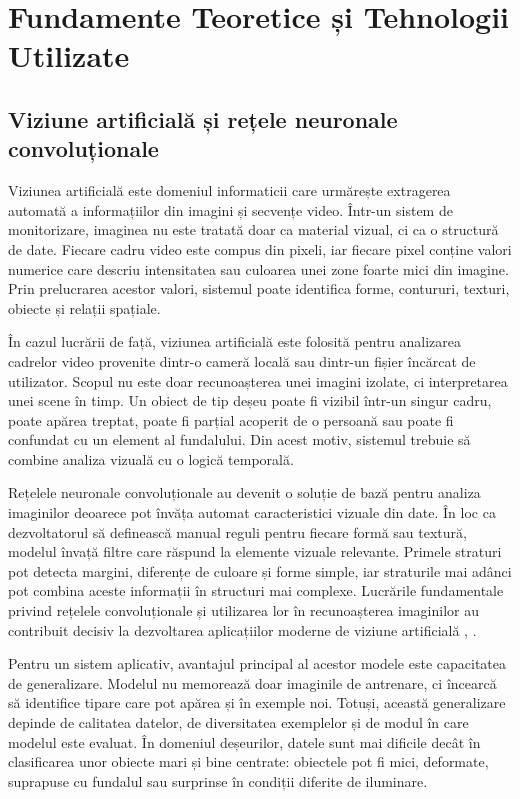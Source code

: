 \chapter{Fundamente Teoretice și Tehnologii Utilizate}

\section{Viziune artificială și rețele neuronale convoluționale}

Viziunea artificială este domeniul informaticii care urmărește extragerea automată a informațiilor din imagini și secvențe video. Într-un sistem de monitorizare, imaginea nu este tratată doar ca material vizual, ci ca o structură de date. Fiecare cadru video este compus din pixeli, iar fiecare pixel conține valori numerice care descriu intensitatea sau culoarea unei zone foarte mici din imagine. Prin prelucrarea acestor valori, sistemul poate identifica forme, contururi, texturi, obiecte și relații spațiale.

În cazul lucrării de față, viziunea artificială este folosită pentru analizarea cadrelor video provenite dintr-o cameră locală sau dintr-un fișier încărcat de utilizator. Scopul nu este doar recunoașterea unei imagini izolate, ci interpretarea unei scene în timp. Un obiect de tip deșeu poate fi vizibil într-un singur cadru, poate apărea treptat, poate fi parțial acoperit de o persoană sau poate fi confundat cu un element al fundalului. Din acest motiv, sistemul trebuie să combine analiza vizuală cu o logică temporală.

Rețelele neuronale convoluționale au devenit o soluție de bază pentru analiza imaginilor deoarece pot învăța automat caracteristici vizuale din date. În loc ca dezvoltatorul să definească manual reguli pentru fiecare formă sau textură, modelul învață filtre care răspund la elemente vizuale relevante. Primele straturi pot detecta margini, diferențe de culoare și forme simple, iar straturile mai adânci pot combina aceste informații în structuri mai complexe. Lucrările fundamentale privind rețelele convoluționale și utilizarea lor în recunoașterea imaginilor au contribuit decisiv la dezvoltarea aplicațiilor moderne de viziune artificială \cite{lecun1998gradient}, \cite{krizhevsky2012imagenet}.

Pentru un sistem aplicativ, avantajul principal al acestor modele este capacitatea de generalizare. Modelul nu memorează doar imaginile de antrenare, ci încearcă să identifice tipare care pot apărea și în exemple noi. Totuși, această generalizare depinde de calitatea datelor, de diversitatea exemplelor și de modul în care modelul este evaluat. În domeniul deșeurilor, datele sunt mai dificile decât în clasificarea unor obiecte mari și bine centrate: obiectele pot fi mici, deformate, suprapuse cu fundalul sau surprinse în condiții diferite de iluminare.

